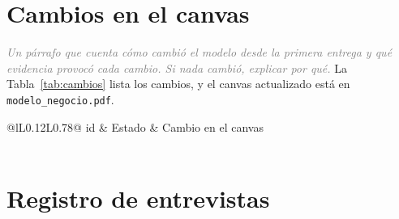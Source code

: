 \documentclass[11pt]{article}
\newcommand{\pendiente}[1]{\textcolor{gray}{\emph{#1}}}
\newcounter{nval}\newcounter{ninval}\newcounter{npend}
\begin{document}
\section{Cambios en el canvas}
\label{sec:cambios}

\pendiente{Un párrafo que cuenta cómo cambió el modelo desde la primera entrega y qué evidencia
provocó cada cambio. Si nada cambió, explicar por qué.} La Tabla~\ref{tab:cambios} lista los
cambios, y el canvas actualizado está en \texttt{modelo\_negocio.pdf}.

\begin{table}[H]
  \caption{Cambios en el canvas y la hipótesis que los provocó.}
  \label{tab:cambios}
  \footnotesize
  \renewcommand{\arraystretch}{1.2}
  \begin{tabular}{@{}lL{0.12\textwidth}L{0.78\textwidth}@{}}
    \toprule
    id & Estado & Cambio en el canvas \\
    \midrule
    \\
    \bottomrule
  \end{tabular}
\end{table}

\clearpage
\appendix
\section{Registro de entrevistas}
\label{sec:anexo}
\end{document}
